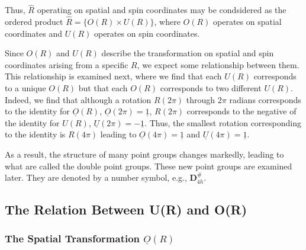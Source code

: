 Thus, ${\hat{R}}$ operating on spatial and spin coordinates may be 
condsidered as the ordered product ${\hat{R}} = \{O(R) \times U(R)\}$, 
where $O(R)$ operates on spatial coordinates and $U(R)$ operates on 
spin coordinates.

Since $O(R)$ and $U(R)$ describe the transformation on spatial and 
spin coordinates arising from a specific $R$, we expect some 
relationship between them.  This relationship is examined next, where 
we find that each $U(R)$ corresponds to a unique $O(R)$ but that each 
$O(R)$ corresponds to two different $U(R)$.  Indeed, we find that 
although a rotation $R(2\pi)$ through $2\pi$ radians corresponds to the 
identity for $\underline{O}(R)$, $\underline{O}(2\pi) = 
\underline{1}$, $R(2\pi)$ corresponds to the negative of the identity 
for $U(R)$, $\underline{U}(2\pi) = - \underline{1}$.  Thus, the 
smallest rotation corresponding to the identity is $R(4\pi)$ leading 
to $\underline{O}(4 \pi) = \underline{1}$ and $\underline{U}(4\pi) = 
\underline{1}$.

As a result, the structure of many point groups changes markedly, 
leading to what are called the double point groups.  These new point 
groups are examined later.  They are denoted by a number symbol, 
e.g., {\bf D}$^{\#}_{4h}$.

\subsection{The Relation Between U(R) and O(R)}

\subsubsection{The Spatial Transformation $\underline{O}(R)$}


